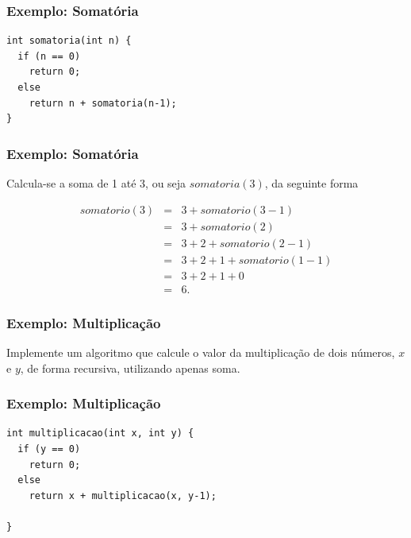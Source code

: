 \documentclass[aspectratio=169]{beamer}
\begin{document}

\begin{frame}[fragile]
\frametitle{Exemplo: Somatória}
\begin{lstlisting}
int somatoria(int n) {
  if (n == 0)
    return 0;
  else 
    return n + somatoria(n-1);
}
\end{lstlisting}
\end{frame}


\begin{frame}[fragile]
\frametitle{Exemplo: Somatória}
Calcula-se a soma de 1 até 3, ou seja $somatoria(3)$, da seguinte forma

\begin{eqnarray}
 somatorio(3)&=& 3 + somatorio(3-1) \nonumber \\
            &=& 3 + somatorio(2) \nonumber \\
	    &=& 3 + 2 + somatorio(2-1) \nonumber \\
	    &=& 3 + 2 + 1 + somatorio(1-1) \nonumber \\
	    &=& 3 + 2 + 1 + 0 \nonumber \\
	    &=& 6. \nonumber 
\end{eqnarray}

\end{frame}

\begin{frame}
\frametitle{Exemplo: Multiplicação}
Implemente um algoritmo que calcule o valor da multiplicação de dois números, $x$ e $y$, de forma recursiva, utilizando apenas soma.
\end{frame}


\begin{frame}[fragile]
\frametitle{Exemplo: Multiplicação}
\begin{lstlisting}
int multiplicacao(int x, int y) {
  if (y == 0)
    return 0;
  else
    return x + multiplicacao(x, y-1);
  
}
\end{lstlisting}
\end{frame}

\end{document}
